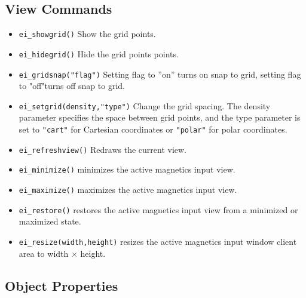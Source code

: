 \subsection{View Commands}
\begin{itemize}
\item \texttt{ei\_showgrid()} Show the grid points.

\item \texttt{ei\_hidegrid()} Hide the grid points points.

\item \texttt{ei\_gridsnap("flag")} Setting flag to ''on'' turns on snap to grid,
setting flag to "off"turns off snap to grid.

\item \texttt{ei\_setgrid(density,"type")} Change the grid spacing. The density
parameter specifies the space between grid points, and the type
parameter is set to \texttt{"cart"} for Cartesian coordinates or
\texttt{"polar"} for polar coordinates.

\item \texttt{ei\_refreshview()} Redraws the current view.

\item{\tt ei\_minimize()} minimizes the active magnetics input view.

\item{\tt ei\_maximize()} maximizes the active magnetics input view.

\item{\tt ei\_restore()} restores the active magnetics input view from a
 minimized or maximized state.

\item{\tt ei\_resize(width,height)} resizes the active magnetics input
 window client area to width $\times$ height.

\end{itemize}




\subsection{Object Properties}

